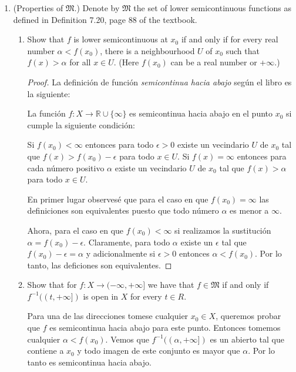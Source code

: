 \documentclass[letter,twoside,12pt]{article}
\begin{document}
\begin{enumerate}
\item  (Properties of $\mathfrak{M}$.)
Denote by $\mathfrak{M}$ the set of lower semicontinuous functions as defined in Definition 7.20, page 88 of the textbook.
\begin{enumerate}
\item Show that $f$ is lower semicontinuous at $x_0$ if and only if for every real number $ \alpha < f(x_{0}) $, there is a neighbourhood $ U $ of $ x_{0} $ such that $ f(x) > \alpha $ for all $ x \in U$. (Here $ f(x_{0}) $ can be a real number or +$ \infty $.)

\begin{proof}

La definición de función \textit{semicontinua hacia abajo} según el libro es la siguiente:

La función $f: X \rightarrow \mathbb{R} \cup \{\infty\} $ es semicontinua hacia abajo en el punto $x_0$ si cumple la siguiente condición:

Si $ f(x_0) < \infty $ entonces para todo $ \epsilon > 0 $ existe un vecindario $ U $ de $ x_0 $ tal que $ f(x) > f(x_0) - \epsilon$ para todo $ x \in U $. Si $ f(x)= \infty $ entonces para cada número positivo $ \alpha $ existe un vecindario $ U $ de $ x_0 $ tal que $ f(x)>\alpha $ para todo $x \in U$.

En primer lugar observesé que para el caso en que $f(x_0) = \infty $ las definiciones son equivalentes puesto que todo número $ \alpha $ es menor a $ \infty $.

Ahora, para el caso en que $f(x_0) < \infty $ si realizamos la sustitución $ \alpha = f(x_0) - \epsilon $. Claramente, para todo $\alpha $ existe un $\epsilon $ tal que $f(x_0) - \epsilon = \alpha$ y adicionalmente si
$\epsilon > 0$ entonces $\alpha < f(x_0)$. Por lo tanto, las deficiones son equivalentes.

\end{proof}

\item Show that for $ f : X \rightarrow (-\infty,+\infty] $ we have that $ f \in \mathfrak{M} $ if and only if $ f^{-1}((t,+\infty]) $ is open in $ X $ for every $ t \in R $.

Para una de las direcciones tomese cualquier $x_0 \in X $, queremos probar que $f $ es semicontinua hacia abajo para este punto. Entonces tomemos cualquier $\alpha < f(x_0) $. Vemos que $ f^{-1}((\alpha,+\infty]) $ es un abierto tal que contiene a $x_0 $ y todo imagen de este conjunto es mayor que $ \alpha $. Por lo tanto es semicontinua hacia abajo.


\end{enumerate}
\end{enumerate}
\end{document}
